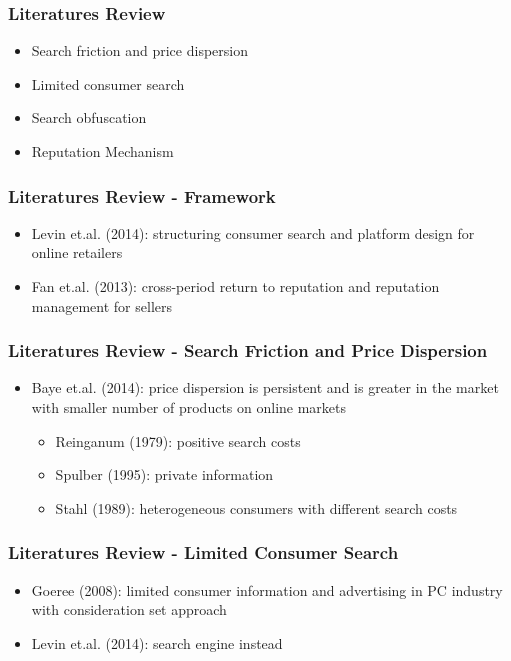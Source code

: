\documentclass{beamer}
\begin{document}
\begin{frame}
\frametitle{Literatures Review}
\begin{itemize}
  \item Search friction and price dispersion
  \item Limited consumer search
  \item Search obfuscation
  \item Reputation Mechanism
\end{itemize}
\end{frame}

\begin{frame}
\frametitle{Literatures Review - Framework}
\begin{itemize}
\item Levin et.al. (2014): structuring consumer search and platform design for online retailers
\item Fan et.al. (2013): cross-period return to reputation and reputation management for sellers
\end{itemize}
\end{frame}

\begin{frame}
\frametitle{Literatures Review - Search Friction and Price Dispersion}
\begin{itemize}
\item Baye et.al. (2014): price dispersion is persistent and is greater in the market with smaller number of products on online markets
\begin{itemize}
\item Reinganum (1979): positive search costs
\item Spulber (1995): private information
\item Stahl (1989): heterogeneous consumers with different search costs
\end{itemize}
\end{itemize}
\end{frame}

\begin{frame}
\frametitle{Literatures Review - Limited Consumer Search}
\begin{itemize}
\item Goeree (2008): limited consumer information and advertising in PC industry with consideration set approach
\item Levin et.al. (2014): search engine instead
\end{itemize}
\end{frame}
\end{document}
